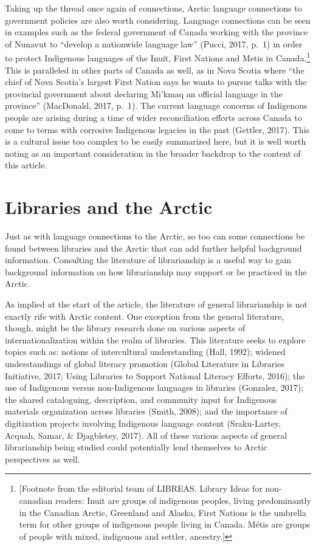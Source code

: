 \documentclass[a4paper,
fontsize=11pt,
oneside,
numbers=noperiodatend,
parskip=half-,
bibliography=totoc,
final
]{scrartcl}
\begin{document}
Taking up the thread once again of connections, Arctic language
connections to government policies are also worth considering. Language
connections can be seen in examples such as the federal government of
Canada working with the province of Nunavut to \enquote{develop a
nationwide language law} (Pucci, 2017, p.~1) in order to protect
Indigenous languages of the Inuit, First Nations and Metis in
Canada.\footnote{{[}Footnote from the editorial team of LIBREAS. Library
  Ideas for non-canadian readers: Inuit are groups of indigenous
  peoples, living predominantly in the Canadian Arctic, Greenland and
  Alaska, First Nations is the umbrella term for other groups of
  indigenous people living in Canada. Métis are groups of people with
  mixed, indigenous and settler, ancestry.{]}} This is paralleled in
other parts of Canada as well, as in Nova Scotia where \enquote{the
chief of Nova Scotia's largest First Nation says he wants to pursue
talks with the provincial government about declaring Mi'kmaq an official
language in the province} (MacDonald, 2017, p.~1). The current language
concerns of Indigenous people are arising during a time of wider
reconciliation efforts across Canada to come to terms with corrosive
Indigenous legacies in the past (Gettler, 2017). This is a cultural
issue too complex to be easily summarized here, but it is well worth
noting as an important consideration in the broader backdrop to the
content of this article.

\hypertarget{libraries-and-the-arctic}{%
\section{Libraries and the Arctic}\label{libraries-and-the-arctic}}

Just as with language connections to the Arctic, so too can some
connections be found between libraries and the Arctic that can add
further helpful background information. Consulting the literature of
librarianship is a useful way to gain background information on how
librarianship may support or be practiced in the Arctic.

As implied at the start of the article, the literature of general
librarianship is not exactly rife with Arctic content. One exception
from the general literature, though, might be the library research done
on various aspects of internationalization within the realm of
libraries. This literature seeks to explore topics such as: notions of
intercultural understanding (Hall, 1992); widened understandings of
global literacy promotion (Global Literature in Libraries Initiative,
2017; Using Libraries to Support National Literacy Efforts, 2016); the
use of Indigenous versus non-Indigenous languages in libraries
(Gonzalez, 2017); the shared cataloguing, description, and community
input for Indigenous materials organization across libraries (Smith,
2008); and the importance of digitization projects involving Indigenous
language content (Sraku-Lartey, Acquah, Samar, \& Djagbletey, 2017). All
of these various aspects of general librarianship being studied could
potentially lend themselves to Arctic perspectives as well.
\end{document}
